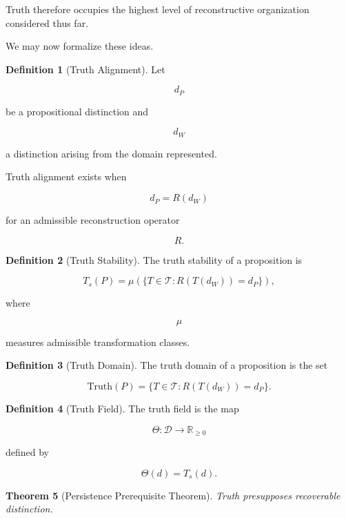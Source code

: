 \documentclass[12pt,oneside]{article}
\newtheorem{theorem}{Theorem}[section] \newtheorem{lemma}[theorem]{Lemma} \newtheorem{proposition}[theorem]{Proposition} \newtheorem{corollary}[theorem]{Corollary}
\theoremstyle{definition}
\newtheorem{definition}[theorem]{Definition} \newtheorem{axiom}[theorem]{Axiom} \newtheorem{remark}[theorem]{Remark} \newtheorem{example}[theorem]{Example}
\begin{document}
Truth therefore occupies the highest level of reconstructive organization considered thus far.

We may now formalize these ideas.

\begin{definition}[Truth Alignment]

Let

\[
d_P
\]

be a propositional distinction and

\[
d_W
\]

a distinction arising from the domain represented.

Truth alignment exists when

\[
d_P
=
R(d_W)
\]

for an admissible reconstruction operator

\[
R.
\]

\end{definition}

\begin{definition}[Truth Stability]

The truth stability of a proposition is

\[
T_s(P)
=
\mu\!\left(
\{T\in\mathcal T :
R(T(d_W))
=
d_P
\}
\right),
\]

where

\[
\mu
\]

measures admissible transformation classes.

\end{definition}

\begin{definition}[Truth Domain]

The truth domain of a proposition is the set

\[
\mathrm{Truth}(P)
=
\{T\in\mathcal T :
R(T(d_W))
=
d_P
\}.
\]

\end{definition}

\begin{definition}[Truth Field]

The truth field is the map

\[
\Theta :
\mathcal D
\rightarrow
\mathbb R_{\ge 0}
\]

defined by

\[
\Theta(d)
=
T_s(d).
\]

\end{definition}

\begin{theorem}[Persistence Prerequisite Theorem]

Truth presupposes recoverable distinction.

\end{theorem}
\end{document}
